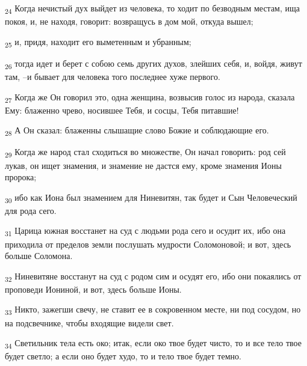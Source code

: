 \begin{tcolorbox}
\textsubscript{24} Когда нечистый дух выйдет из человека, то ходит по безводным местам, ища покоя, и, не находя, говорит: возвращусь в дом мой, откуда вышел;
\end{tcolorbox}
\begin{tcolorbox}
\textsubscript{25} и, придя, находит его выметенным и убранным;
\end{tcolorbox}
\begin{tcolorbox}
\textsubscript{26} тогда идет и берет с собою семь других духов, злейших себя, и, войдя, живут там, --и бывает для человека того последнее хуже первого.
\end{tcolorbox}
\begin{tcolorbox}
\textsubscript{27} Когда же Он говорил это, одна женщина, возвысив голос из народа, сказала Ему: блаженно чрево, носившее Тебя, и сосцы, Тебя питавшие!
\end{tcolorbox}
\begin{tcolorbox}
\textsubscript{28} А Он сказал: блаженны слышащие слово Божие и соблюдающие его.
\end{tcolorbox}
\begin{tcolorbox}
\textsubscript{29} Когда же народ стал сходиться во множестве, Он начал говорить: род сей лукав, он ищет знамения, и знамение не дастся ему, кроме знамения Ионы пророка;
\end{tcolorbox}
\begin{tcolorbox}
\textsubscript{30} ибо как Иона был знамением для Ниневитян, так будет и Сын Человеческий для рода сего.
\end{tcolorbox}
\begin{tcolorbox}
\textsubscript{31} Царица южная восстанет на суд с людьми рода сего и осудит их, ибо она приходила от пределов земли послушать мудрости Соломоновой; и вот, здесь больше Соломона.
\end{tcolorbox}
\begin{tcolorbox}
\textsubscript{32} Ниневитяне восстанут на суд с родом сим и осудят его, ибо они покаялись от проповеди Иониной, и вот, здесь больше Ионы.
\end{tcolorbox}
\begin{tcolorbox}
\textsubscript{33} Никто, зажегши свечу, не ставит ее в сокровенном месте, ни под сосудом, но на подсвечнике, чтобы входящие видели свет.
\end{tcolorbox}
\begin{tcolorbox}
\textsubscript{34} Светильник тела есть око; итак, если око твое будет чисто, то и все тело твое будет светло; а если оно будет худо, то и тело твое будет темно.
\end{tcolorbox}
